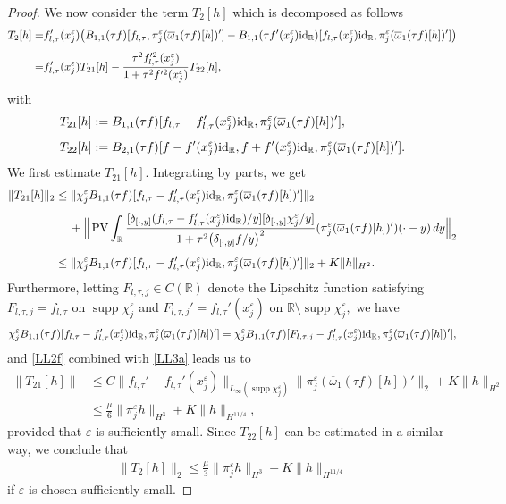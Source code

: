 \documentclass[11pt,reqno]{amsart}
\numberwithin{equation}{section}
\newcommand{\PV}{\mathop{\rm PV}\nolimits}
\newcommand{\0}{\Omega}
\newcommand{\e}{\varepsilon}
\newcommand{\ov}{\overline}
\newcommand{\oo}{\ov\omega}
\newcommand{\R}{\mathbb{R}}
\DeclareMathOperator{\supp}{supp}
\numberwithin{equation}{section}
\begin{document}
\begin{proof}
We now consider the term $T_2[h]$ which is decomposed as follows 
\begin{align*}
 T_2[h]=&f_{l,\tau}'(x_j^\e)\big(B_{1,1}(\tau f)[f_{l,\tau},\pi^\e_j(\oo_1(\tau f)[h])']-B_{1,1}(\tau f'(x_j^\e){\rm id}_\R)[f_{l,\tau}(x_j^\e){\rm id}_\R,\pi^\e_j(\oo_1(\tau f)[h])']\big)\\[1ex]
 =& f_{l,\tau}'(x_j^\e)  T_{21}[h]-\frac{\tau^2f_{l,\tau}'^2(x_j^\e)}{1+\tau^2f'^2(x_j^\e)} T_{22}[h],
\end{align*}
 with
\begin{align*}
 T_{21}[h]&:=B_{1,1}(\tau f)[f_{l,\tau}-f_{l,\tau}'(x_j^\e){\rm id}_\R ,\pi_j^\e(\oo_1(\tau f)[h])'],\\[1ex]
  T_{22}[h]&:=B_{2,1}(\tau f)[f-f'(x_j^\e){\rm id}_\R,f+f'(x_j^\e){\rm id}_\R,\pi_j^\e(\oo_1(\tau f)[h])'].
\end{align*}
We  first estimate $T_{21}[h]$. Integrating by parts, we get
\begin{align}
 \|T_{21}[h]\|_2&\leq\|\chi_j^\e B_{1,1}(\tau f)[f_{l,\tau}-f_{l,\tau}'(x_j^\e){\rm id}_\R ,\pi_j^\e(\oo_1(\tau f)[h])']\|_2\nonumber\\[1ex]
 &\hspace{0.424cm}+\Big\|\PV\int_\R\frac{[\delta_{[\cdot,y]} (f_{l,\tau}-f_{l,\tau}'(x_j^\e){\rm id}_\R)/y][\delta_{[\cdot, y]}\chi_j^\e/y]}{1+\tau^2\big( \delta_{[\cdot,y]} f/y\big)^2}(\pi^\e_j(\oo_1(\tau f)[h])')(\cdot-y)\,dy\Big\|_2\nonumber\\[1ex]
&\leq \|\chi_j^\e B_{1,1}(\tau f)[f_{l,\tau}-f_{l,\tau}'(x_j^\e){\rm id}_\R ,\pi_j^\e(\oo_1(\tau f)[h])']\|_2+ K\|h\|_{H^2}.\label{LL3a}
\end{align}
Furthermore, letting $F_{l,\tau,j}\in C(\R)$ denote the Lipschitz function satisfying $F_{l,\tau,j}=f_{l,\tau}$ on $\supp \chi_j^\e$ and $F_{l,\tau,j}'=f_{l,\tau}'(x_j^\e)$ on $\R\setminus \supp \chi_j^\e,$
we have
\begin{align*}
 \chi_j^\e B_{1,1}(\tau f)[f_{l,\tau}-f_{l,\tau}'(x_j^\e){\rm id}_\R ,\pi_j^\e(\oo_1(\tau f)[h])']=\chi_j^\e B_{1,1}(\tau f)[F_{l,\tau,j}-f_{l,\tau}'(x_j^\e){\rm id}_\R ,\pi_j^\e(\oo_1(\tau f)[h])'],
\end{align*}
and   \eqref{LL2f} combined with  \eqref{LL3a}  leads us to
\begin{align*}
 \|T_{21}[h]\|&\leq C\|f_{l,\tau}'-f_{l,\tau}'(x_j^\e)\|_{L_\infty(\supp \chi_j^\e)}\|\pi_j^\e(\oo_1(\tau f)[h])'\|_2+ K\|h\|_{H^2}\\[1ex]
 &\leq\frac{\mu}{6}\|\pi^\e_j h \|_{H^3}+ K\|h\|_{H^{11/4}},
\end{align*}
provided that $\e$ is sufficiently small.
Since $T_{22}[h]$ can be estimated in a similar way, we  conclude that
\begin{align}
  \|T_{2}[h]\|_{2}\leq   \frac{\mu}{3}\|\pi^\e_j h \|_{H^3}+ K\|h\|_{H^{11/4}}\label{LL2aaa}
\end{align}
if $\e$ is chosen sufficiently small.



\end{proof}
\end{document}
